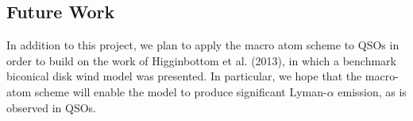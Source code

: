 \documentclass[usenatbib, a4paper]{mn2e}
\begin{document}


\subsection{Future Work}

In addition to this project, we plan to apply the macro atom scheme to QSOs in order to build on the work of Higginbottom et al. (2013),
in which a benchmark biconical disk wind model was presented. In particular, we hope that the macro-atom scheme will enable the
model to produce significant Lyman-$\alpha$ emission, as is observed in QSOs.





\end{document}
